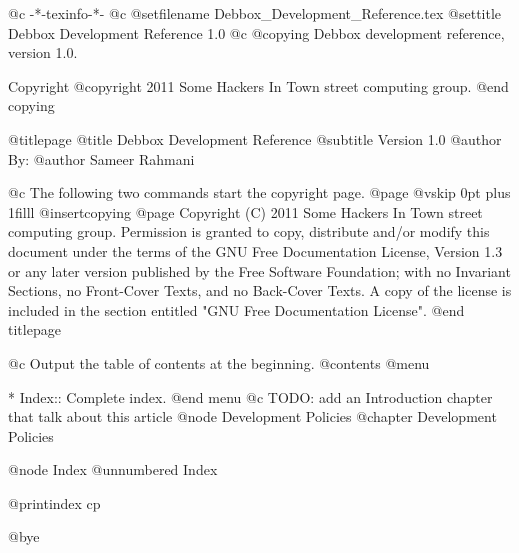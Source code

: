    @c -*-texinfo-*-
@c %
@setfilename Debbox_Development_Reference.tex
@settitle Debbox Development Reference 1.0
@c %
@copying
Debbox development reference, version 1.0.

Copyright @copyright{} 2011 Some Hackers In Town street computing group.
@end copying

@titlepage
@title Debbox Development Reference
@subtitle Version 1.0
@author By:
@author Sameer Rahmani

@c The following two commands start the copyright page.
@page
@vskip 0pt plus 1filll
@insertcopying
@page
Copyright (C)  2011  Some Hackers In Town street computing group.
Permission is granted to copy, distribute and/or modify this document
under the terms of the GNU Free Documentation License, Version 1.3
or any later version published by the Free Software Foundation;
with no Invariant Sections, no Front-Cover Texts, and no Back-Cover Texts.
A copy of the license is included in the section entitled "GNU
Free Documentation License".
@end titlepage

@c Output the table of contents at the beginning.
@contents
@menu

* Index::            Complete index.
@end menu
@c TODO: add an Introduction chapter that talk about this article
@node Development Policies
@chapter Development Policies

@node Index
@unnumbered Index

@printindex cp

@bye
